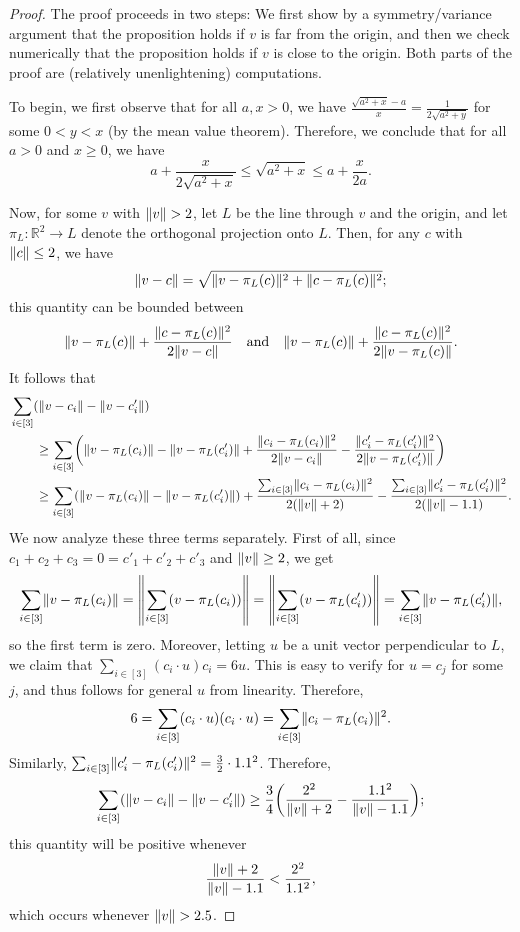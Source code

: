 \documentclass[11pt]{amsart}
\theoremstyle{definition}
\DeclarePairedDelimiter{\paren}{(}{)}
\DeclarePairedDelimiter{\Abs}{\lVert}{\rVert}
\newcommand{\RR}{\mathbb{R}}
\begin{document}
\begin{proof}
The proof proceeds in two steps: We first show by a symmetry/variance argument that the proposition holds if $v$ is far from the origin, and then we check numerically that the proposition holds if $v$ is close to the origin.  Both parts of the proof are (relatively unenlightening) computations.

To begin, we first observe that for all $a, x > 0$, we have $\frac{\sqrt{a^2+x}-a}{x} = \frac{1}{2\sqrt{a^2+y}}$ for some $0 < y < x$ (by the mean value theorem). Therefore, we conclude that for all $a > 0$ and $x \geq 0$, we have
\[a + \frac{x}{2\sqrt{a^2+x}} \leq \sqrt{a^2 + x} \leq a + \frac{x}{2a}.\]

Now, for some $v$ with $\Abs{v} > 2$, let $L$ be the line through $v$ and the origin, and let $\pi_L \colon \RR^2 \to L$ denote the orthogonal projection onto $L$. Then, for any $c$ with $\Abs{c} \leq 2$, we have
\[\Abs{v - c} = \sqrt{\Abs{v - \pi_L(c)}^2 + \Abs{c - \pi_L(c)}^2};\]
this quantity can be bounded between
\[\Abs{v - \pi_L(c)} + \frac{\Abs{c - \pi_L(c)}^2}{2\Abs{v - c}} \quad \text{and} \quad \Abs{v - \pi_L(c)} + \frac{\Abs{c - \pi_L(c)}^2}{2\Abs{v - \pi_L(c)}}.\]
It follows that
\begin{align*}
    \MoveEqLeft \sum_{i \in [3]} \paren*{\Abs{v - c_i} - \Abs{v - c'_i}} \\ &\geq \sum_{i \in [3]} \paren*{\Abs{v - \pi_L(c_i)} - \Abs{v - \pi_L(c'_i)} + \frac{\Abs{c_i - \pi_L(c_i)}^2}{2\Abs{v - c_i}} - \frac{\Abs{c'_i - \pi_L(c'_i)}^2}{2\Abs{v - \pi_L(c'_i)}}} \\
    &\geq \sum_{i \in [3]} \paren*{\Abs{v - \pi_L(c_i)} - \Abs{v - \pi_L(c'_i)}} + \frac{\sum_{i \in [3]}\Abs{c_i - \pi_L(c_i)}^2}{2(\Abs{v}+2)} - \frac{\sum_{i \in [3]}\Abs{c'_i - \pi_L(c'_i)}^2}{2(\Abs{v}-1.1)}.
\end{align*}
We now analyze these three terms separately. First of all, since $c_1 + c_2 + c_3 = 0 = c'_1 + c'_2 + c'_3$ and $\Abs{v} \geq 2$, we get
\[\sum_{i \in [3]}\Abs{v - \pi_L(c_i)} = \Abs*{\sum_{i \in [3]}(v - \pi_L(c_i))} = \Abs*{\sum_{i \in [3]}(v - \pi_L(c'_i))} = \sum_{i \in [3]}\Abs{v - \pi_L(c'_i)},\]
so the first term is zero. Moreover, letting $u$ be a unit vector perpendicular to $L$, we claim that $\sum_{i \in [3]}(c_i \cdot u) c_i = 6u$. This is easy to verify for $u = c_j$ for some $j$, and thus follows for general $u$ from linearity. Therefore,
\[6 = \sum_{i \in [3]}(c_i \cdot u) (c_i \cdot u) = \sum_{i \in [3]} \Abs{c_i - \pi_L(c_i)}^2.\]
Similarly, $\sum_{i \in [3]} \Abs{c'_i - \pi_L(c'_i)}^2 = \frac{3}{2}\cdot 1.1^2$. Therefore,
\[\sum_{i \in [3]} \paren*{\Abs{v - c_i} - \Abs{v - c'_i}} \geq \frac{3}{4} \paren*{\frac{2^2}{\Abs{v}+2} - \frac{1.1^2}{\Abs{v}-1.1}};\]
this quantity will be positive whenever
\[\frac{\Abs{v} + 2}{\Abs{v} - 1.1} < \frac{2^2}{1.1^2},\]
which occurs whenever $\Abs{v} > 2.5$.


\end{proof}
\end{document}
